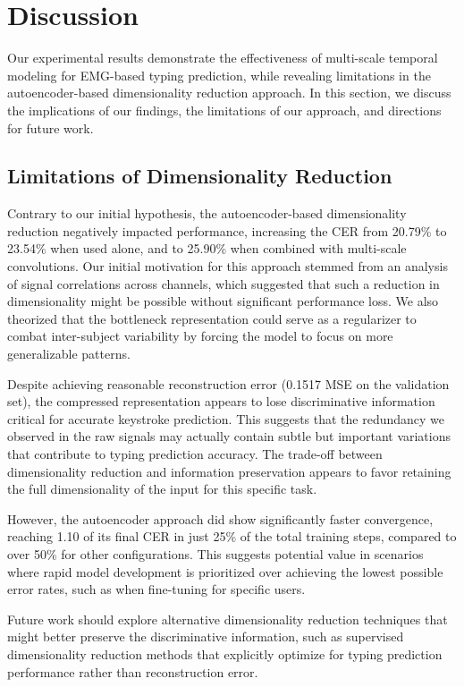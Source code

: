 \section{Discussion}

Our experimental results demonstrate the effectiveness of multi-scale temporal modeling for EMG-based typing prediction, while revealing limitations in the autoencoder-based dimensionality reduction approach. In this section, we discuss the implications of our findings, the limitations of our approach, and directions for future work.

\subsection{Limitations of Dimensionality Reduction}

Contrary to our initial hypothesis, the autoencoder-based dimensionality reduction negatively impacted performance, increasing the CER from 20.79\% to 23.54\% when used alone, and to 25.90\% when combined with multi-scale convolutions. Our initial motivation for this approach stemmed from an analysis of signal correlations across channels, which suggested that such a reduction in dimensionality might be possible without significant performance loss. We also theorized that the bottleneck representation could serve as a regularizer to combat inter-subject variability by forcing the model to focus on more generalizable patterns.

Despite achieving reasonable reconstruction error (0.1517 MSE on the validation set), the compressed representation appears to lose discriminative information critical for accurate keystroke prediction. This suggests that the redundancy we observed in the raw signals may actually contain subtle but important variations that contribute to typing prediction accuracy. The trade-off between dimensionality reduction and information preservation appears to favor retaining the full dimensionality of the input for this specific task.

However, the autoencoder approach did show significantly faster convergence, reaching 1.10 of its final CER in just 25\% of the total training steps, compared to over 50\% for other configurations. This suggests potential value in scenarios where rapid model development is prioritized over achieving the lowest possible error rates, such as when fine-tuning for specific users.

Future work should explore alternative dimensionality reduction techniques that might better preserve the discriminative information, such as supervised dimensionality reduction methods that explicitly optimize for typing prediction performance rather than reconstruction error.

